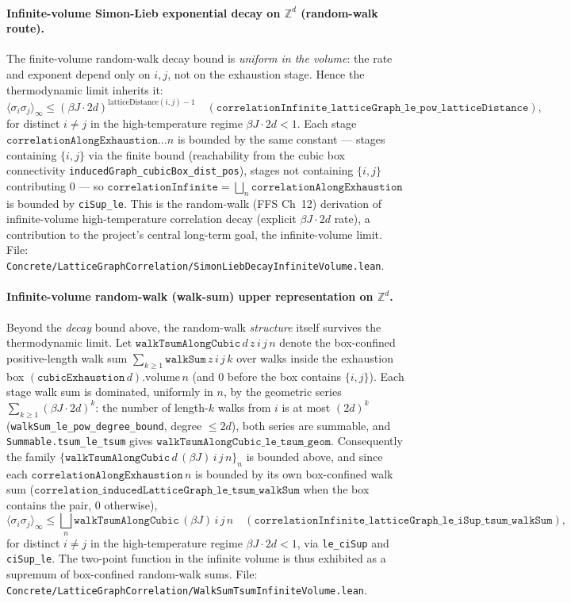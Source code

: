 \documentclass[a4paper,11pt]{article}
\begin{document}
\paragraph{Infinite-volume Simon-Lieb exponential decay on $\mathbb Z^d$ (random-walk route).}
The finite-volume random-walk decay bound is \emph{uniform in the volume}: the
rate and exponent depend only on $i,j$, not on the exhaustion stage. Hence the
thermodynamic limit inherits it:
\[
  \langle\sigma_i\sigma_j\rangle_\infty
    \le (\beta J \cdot 2d)^{\mathrm{latticeDistance}(i,j)-1}
  \quad (\texttt{correlationInfinite\_latticeGraph\_le\_pow\_latticeDistance}),
\]
for distinct $i \ne j$ in the high-temperature regime $\beta J \cdot 2d < 1$. Each
stage $\texttt{correlationAlongExhaustion}\ldots n$ is bounded by the same
constant --- stages containing $\{i,j\}$ via the finite bound (reachability from
the cubic box connectivity \texttt{inducedGraph\_cubicBox\_dist\_pos}), stages not
containing $\{i,j\}$ contributing $0$ --- so $\texttt{correlationInfinite} =
\bigsqcup_n \texttt{correlationAlongExhaustion}$ is bounded by
\texttt{ciSup\_le}. This is the random-walk (FFS Ch~12) derivation of
infinite-volume high-temperature correlation decay (explicit $\beta J\cdot 2d$
rate), a contribution to the project's central long-term goal, the infinite-volume
limit. File:
\texttt{Concrete/LatticeGraphCorrelation/SimonLiebDecayInfiniteVolume.lean}.

\paragraph{Infinite-volume random-walk (walk-sum) upper representation on $\mathbb Z^d$.}
Beyond the \emph{decay} bound above, the random-walk \emph{structure} itself
survives the thermodynamic limit. Let $\texttt{walkTsumAlongCubic}\,d\,z\,i\,j\,n$
denote the box-confined positive-length walk sum $\sum_{k\ge 1}\texttt{walkSum}\,z\,i\,j\,k$
over walks inside the exhaustion box $(\texttt{cubicExhaustion}\,d).\mathrm{volume}\,n$
(and $0$ before the box contains $\{i,j\}$). Each stage walk sum is dominated,
uniformly in $n$, by the geometric series $\sum_{k\ge 1}(\beta J\cdot 2d)^k$: the
number of length-$k$ walks from $i$ is at most $(2d)^k$
(\texttt{walkSum\_le\_pow\_degree\_bound}, degree $\le 2d$), both series are
summable, and \texttt{Summable.tsum\_le\_tsum} gives
$\texttt{walkTsumAlongCubic\_le\_tsum\_geom}$. Consequently the family
$\{\texttt{walkTsumAlongCubic}\,d\,(\beta J)\,i\,j\,n\}_n$ is bounded above, and
since each $\texttt{correlationAlongExhaustion}\,n$ is bounded by its own
box-confined walk sum
($\texttt{correlation\_inducedLatticeGraph\_le\_tsum\_walkSum}$ when the box
contains the pair, $0$ otherwise),
\[
  \langle\sigma_i\sigma_j\rangle_\infty
    \le \bigsqcup_n \texttt{walkTsumAlongCubic}\,(\beta J)\,i\,j\,n
  \quad (\texttt{correlationInfinite\_latticeGraph\_le\_iSup\_tsum\_walkSum}),
\]
for distinct $i \ne j$ in the high-temperature regime $\beta J\cdot 2d < 1$, via
\texttt{le\_ciSup} and \texttt{ciSup\_le}. The two-point function in the infinite
volume is thus exhibited as a supremum of box-confined random-walk sums. File:
\texttt{Concrete/LatticeGraphCorrelation/WalkSumTsumInfiniteVolume.lean}.
\end{document}

